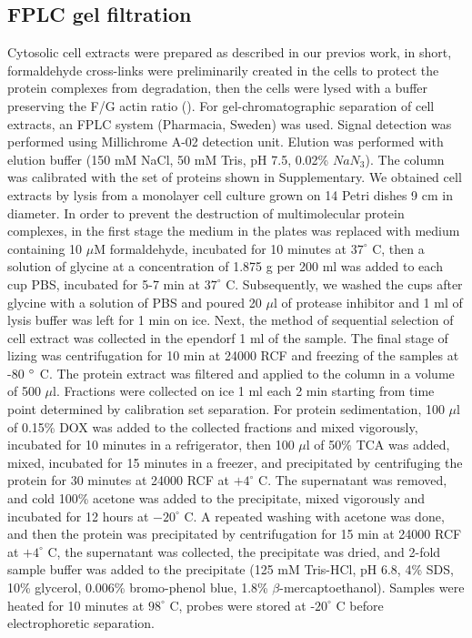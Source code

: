 \documentclass[alpha-refs]{wiley-article}
\begin{document}
\subsection{FPLC gel filtration}

Cytosolic cell extracts were prepared as described in our previos work, in short, formaldehyde cross-links were preliminarily created in the cells to protect the protein complexes from degradation, then the cells were lysed with a buffer preserving the F/G actin ratio (\cite{bobkov2017effect}).
For gel-chromatographic separation of cell extracts, an FPLC system (Pharmacia, Sweden) was used.
Signal detection was performed using Millichrome A-02 detection unit.
Elution was performed with elution buffer (150 mM NaCl, 50 mM Tris, pH 7.5, 0.02\% $NaN_3$).
The column was calibrated with the set of proteins shown in Supplementary.
We obtained cell extracts by lysis from a monolayer cell culture grown on 14 Petri dishes 9 cm in diameter.
In order to prevent the destruction of multimolecular protein complexes, in the first stage the medium in the plates was replaced with medium containing 10 $\mu$M formaldehyde, incubated for 10 minutes at $37^{\circ}$ C, then a solution of glycine at a concentration of 1.875 g per 200 ml was added to each cup PBS, incubated for 5-7 min at  $37^{\circ}$  C.
Subsequently, we washed the cups after glycine with a solution of PBS and poured 20 $\mu$l of protease inhibitor and 1 ml of lysis buffer was left for 1 min on ice.
Next, the method of sequential selection of cell extract was collected in the ependorf 1 ml of the sample.
The final stage of lizing was centrifugation for 10 min at 24000 RCF and freezing of the samples at -80 $\degree$ C.
The protein extract was filtered and applied to the column in a volume of 500 $\mu$l.
Fractions were collected on ice 1 ml each 2 min starting from time point determined by calibration set separation.
For protein sedimentation, 100 $\mu$l of 0.15\% DOX was added to the collected fractions and mixed vigorously, incubated for 10 minutes in a refrigerator, then 100 $\mu$l of 50\% TCA was added, mixed, incubated for 15 minutes in a freezer, and precipitated by centrifuging the protein for 30 minutes at 24000 RCF at $+4^{\circ}$ C.
The supernatant was removed, and cold 100\% acetone was added to the precipitate, mixed vigorously and incubated for 12 hours at $-20^{\circ}$ C.
A repeated washing with acetone was done, and then the protein was precipitated by centrifugation for 15 min at 24000 RCF at $+4^{\circ}$ C, the supernatant was collected, the precipitate was dried, and 2-fold sample buffer was added to the precipitate (125 mM Tris-HCl, pH 6.8, 4\% SDS, 10\% glycerol, 0.006\% bromo-phenol blue, 1.8\% $\beta$-mercaptoethanol).
Samples were heated for 10 minutes at $98^{\circ}$ C, probes were stored at -$20^{\circ}$ C before electrophoretic separation.
\end{document}
